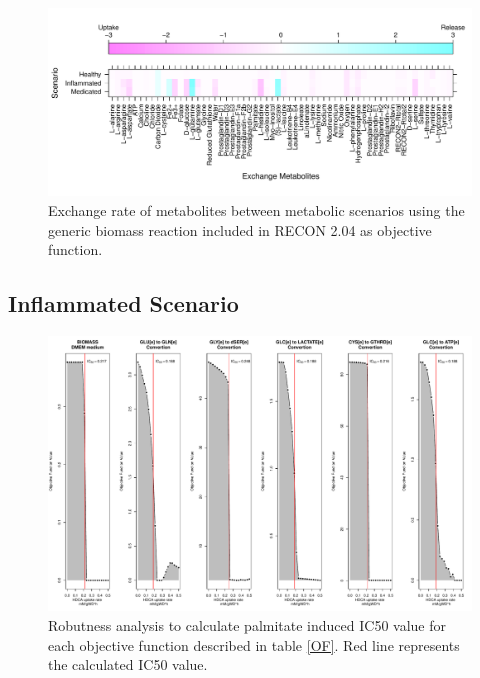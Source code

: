 \begin{figure}[h]
\begin{center}
\includegraphics[width=\textwidth]{neuroprotective/Exchanges}
\end{center}
\caption{Exchange rate of metabolites between metabolic scenarios using the generic biomass reaction included in RECON 2.04 as objective function.}
\label{Exchanges}
\end{figure}

\subsection*{Inflammated Scenario}
\begin{figure}[h]
\begin{center}
\includegraphics[width=\textwidth]{neuroprotective/IC50}
\end{center}
\caption{Robutness analysis to calculate palmitate induced IC50 value for each objective function described in table \ref{OF}. Red line represents the calculated IC50 value.}
\end{figure}


